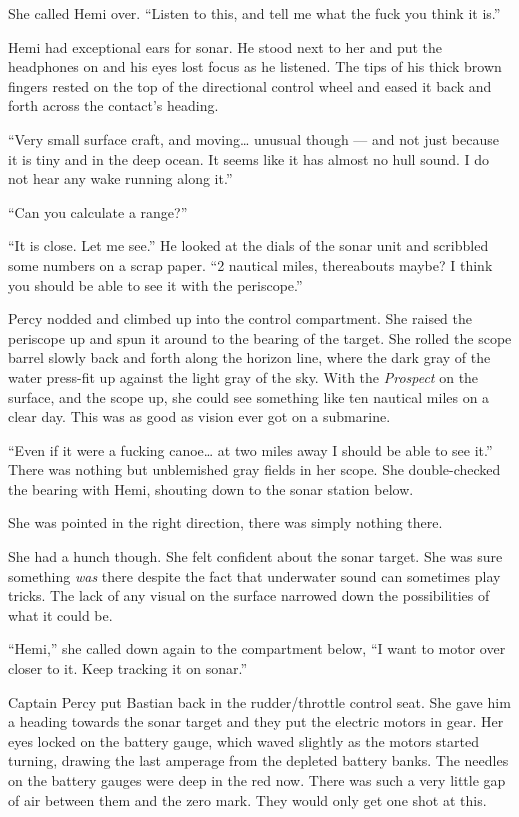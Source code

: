 \documentclass[
]{scrbook}
\begin{document}
She called Hemi over. ``Listen to this, and tell me what the fuck you
think it is.''

Hemi had exceptional ears for sonar. He stood next to her and put the
headphones on and his eyes lost focus as he listened. The tips of his
thick brown fingers rested on the top of the directional control wheel
and eased it back and forth across the contact's heading.

``Very small surface craft, and moving\ldots{} unusual though --- and
not just because it is tiny and in the deep ocean. It seems like it has
almost no hull sound. I do not hear any wake running along it.''

``Can you calculate a range?''

``It is close. Let me see.'' He looked at the dials of the sonar unit
and scribbled some numbers on a scrap paper. ``2 nautical miles,
thereabouts maybe? I think you should be able to see it with the
periscope.''

Percy nodded and climbed up into the control compartment. She raised the
periscope up and spun it around to the bearing of the target. She rolled
the scope barrel slowly back and forth along the horizon line, where the
dark gray of the water press-fit up against the light gray of the sky.
With the \emph{Prospect} on the surface, and the scope up, she could see
something like ten nautical miles on a clear day. This was as good as
vision ever got on a submarine.

``Even if it were a fucking canoe\ldots{} at two miles away I should be
able to see it.'' There was nothing but unblemished gray fields in her
scope. She double-checked the bearing with Hemi, shouting down to the
sonar station below.

She was pointed in the right direction, there was simply nothing there.

She had a hunch though. She felt confident about the sonar target. She
was sure something \emph{was} there despite the fact that underwater
sound can sometimes play tricks. The lack of any visual on the surface
narrowed down the possibilities of what it could be.

``Hemi,'' she called down again to the compartment below, ``I want to
motor over closer to it. Keep tracking it on sonar.''

Captain Percy put Bastian back in the rudder/throttle control seat. She
gave him a heading towards the sonar target and they put the electric
motors in gear. Her eyes locked on the battery gauge, which waved
slightly as the motors started turning, drawing the last amperage from
the depleted battery banks. The needles on the battery gauges were deep
in the red now. There was such a very little gap of air between them and
the zero mark. They would only get one shot at this.
\end{document}

